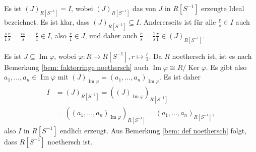 \documentclass[a4paper,10pt]{article}
\theoremstyle{definition}
\newcommand{\Img}{\operatorname{Im}}
\newcommand{\Ker}{\operatorname{Ker}}
\begin{document}
Es ist $(J)_{R[S^{-1}]} = I$, wobei $(J)_{R[S^{-1}]}$ das von $J$ in $R[S^{-1}]$ erzeugte Ideal bezeichnet. Es ist klar, dass $(J)_{R[S^{-1}]} \subseteq I$. Andererseits ist für alle $\frac{r}{s} \in I$ auch $\frac{s}{1} \frac{r}{s} = \frac{rs}{s} = \frac{r}{1} \in I$, also $\frac{r}{1} \in J$, und daher auch $\frac{r}{s} = \frac{1}{s} \frac{r}{1} \in (J)_{R[S^{-1}]}$.

Es ist $J \subseteq \Img \varphi$, wobei $\varphi : R \rightarrow R[S^{-1}], r \mapsto \frac{r}{1}$. Da $R$ noethersch ist, ist es nach Bemerkung \ref{bem: faktorringe noethersch} auch $\Img \varphi \cong R / \Ker \varphi$. Es gibt also $a_1, \ldots, a_n \in \Img \varphi$ mit $(J)_{\Img \varphi} = (a_1, \ldots, a_n)_{\Img \varphi}$. Es ist daher
\begin{align*}
 I
 &= (J)_{R[S^{-1}]}
 = ((J)_{\Img \varphi})_{R[S^{-1}]} \\
 &= ((a_1, \ldots, a_n)_{\Img \varphi})_{R[S^{-1}]}
 = (a_1, \ldots, a_n)_{R[S^{-1}]},
\end{align*}
also $I$ in $R[S^{-1}]$ endlich erzeugt. Aus Bemerkung \ref{bem: def noethersch} folgt, dass $R[S^{-1}]$ noethersch ist.
\end{document}

